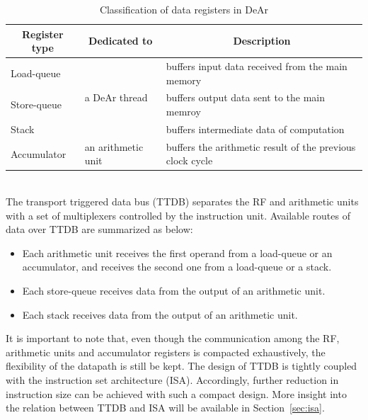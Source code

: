 \begin{table}[!ht]
    \caption{Classification of data registers in DeAr}
    \label{tab:register}
    \centering
    \begin{tabular}{|l|l|l|}
        \hline
        \multicolumn{1}{|c|}{\textbf{Register type}} & \multicolumn{1}{c|}{\textbf{Dedicated to}} & \multicolumn{1}{c|}{\textbf{Description}}                 \\ \hline
        Load-queue                                   & \multirow{3}{*}{a DeAr thread}             & buffers input data received from the main memory          \\ \cline{1-1} \cline{3-3} 
        Store-queue                                  &                                            & buffers output data sent to the main memroy               \\ \cline{1-1} \cline{3-3} 
        Stack                                        &                                            & buffers intermediate data of computation                  \\ \hline
        Accumulator                                  & an arithmetic unit                         & buffers the arithmetic result of the previous clock cycle \\ \hline
    \end{tabular}
\end{table}
\\\indent
The transport triggered data bus (TTDB) separates the RF and arithmetic units with a set of multiplexers controlled by the instruction unit.
Available routes of data over TTDB are summarized as below:
\begin{itemize}
    \item Each arithmetic unit receives the first operand from a load-queue or an accumulator, 
        and receives the second one from a load-queue or a stack.
    \item Each store-queue receives data from the output of an arithmetic unit.
    \item Each stack receives data from the output of an arithmetic unit.
\end{itemize}
It is important to note that, even though the communication among the RF, arithmetic units and accumulator registers is compacted exhaustively, 
the flexibility of the datapath is still be kept.
The design of TTDB is tightly coupled with the instruction set architecture (ISA).
Accordingly, further reduction in instruction size can be achieved with such a compact design.
More insight into the relation between TTDB and ISA will be available in Section~\ref{sec:isa}.

